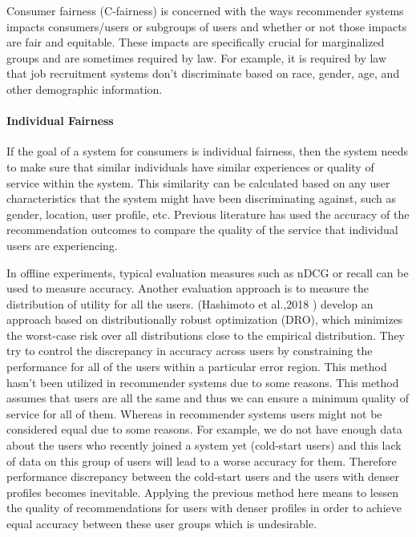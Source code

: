             Consumer fairness (C-fairness) is concerned with the ways recommender systems impacts consumers/users or subgroups of users and whether or not those impacts are fair and equitable. These impacts are specifically crucial for marginalized groups and are sometimes required by law. For example, it is required by law that job recruitment systems don't discriminate based on race, gender, age, and other demographic information.
        
            \vspace{0.25cm}
            \noindent \paragraph{Individual Fairness}
            \vspace{0.25cm}
                If the goal of a system for consumers is individual fairness, then the system needs to make sure that similar individuals have similar experiences or quality of service within the system. This similarity can be calculated based on any user characteristics that the system might have been discriminating against, such as gender, location, user profile, etc. Previous literature has used the accuracy of the recommendation outcomes to compare the quality of the service that individual users are experiencing. 
            
                In offline experiments, typical evaluation measures such as nDCG or recall can be used to measure accuracy. Another evaluation approach is to measure the distribution of utility for all the users. (Hashimoto et al.,2018 \cite{hashimoto2018fairness}) develop an approach based on distributionally robust optimization (DRO), which minimizes the worst-case risk over all distributions close to the empirical distribution. They try to control the discrepancy in accuracy across users by constraining the performance for all of the users within a particular error region. This method hasn't been utilized in recommender systems due to some reasons. This method assumes that users are all the same and thus we can ensure a minimum quality of service for all of them. Whereas in recommender systems users might not be considered equal due to some reasons. For example, we do not have enough data about the users who recently joined a system yet (cold-start users) and this lack of data on this group of users will lead to a worse accuracy for them. Therefore performance discrepancy between the cold-start users and the users with denser profiles becomes inevitable. Applying the previous method here means to lessen the quality of recommendations for users with denser profiles in order to achieve equal accuracy between these user groups which is undesirable.
            
